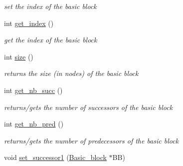 \begin{DoxyCompactItemize}
\begin{DoxyCompactList}\small\item\em set the index of the basic block \end{DoxyCompactList}\item 
\hypertarget{classBasic__block_a8cb196904537be8fb0474afce7c769c1}{int \hyperlink{classBasic__block_a8cb196904537be8fb0474afce7c769c1}{get\-\_\-index} ()}\label{classBasic__block_a8cb196904537be8fb0474afce7c769c1}

\begin{DoxyCompactList}\small\item\em get the index of the basic block \end{DoxyCompactList}\item 
\hypertarget{classBasic__block_a5574d52e3ecdbf36e52c42c31bfc73db}{int \hyperlink{classBasic__block_a5574d52e3ecdbf36e52c42c31bfc73db}{size} ()}\label{classBasic__block_a5574d52e3ecdbf36e52c42c31bfc73db}

\begin{DoxyCompactList}\small\item\em returns the size (in nodes) of the basic block \end{DoxyCompactList}\item 
\hypertarget{classBasic__block_a3ccc47a22b9d5d9e932862ab37783225}{int \hyperlink{classBasic__block_a3ccc47a22b9d5d9e932862ab37783225}{get\-\_\-nb\-\_\-succ} ()}\label{classBasic__block_a3ccc47a22b9d5d9e932862ab37783225}

\begin{DoxyCompactList}\small\item\em returns/gets the number of successors of the basic block \end{DoxyCompactList}\item 
\hypertarget{classBasic__block_ade6f71459e5b54108022a16a4a6a00cb}{int \hyperlink{classBasic__block_ade6f71459e5b54108022a16a4a6a00cb}{get\-\_\-nb\-\_\-pred} ()}\label{classBasic__block_ade6f71459e5b54108022a16a4a6a00cb}

\begin{DoxyCompactList}\small\item\em returns/gets the number of predecessors of the basic block \end{DoxyCompactList}\item 
\hypertarget{classBasic__block_ab89b4c97465f5a0639475b38baeb51be}{void \hyperlink{classBasic__block_ab89b4c97465f5a0639475b38baeb51be}{set\-\_\-successor1} (\hyperlink{classBasic__block}{\-Basic\-\_\-block} $\ast$\-B\-B)}\label{classBasic__block_ab89b4c97465f5a0639475b38baeb51be}


\end{DoxyCompactItemize}

